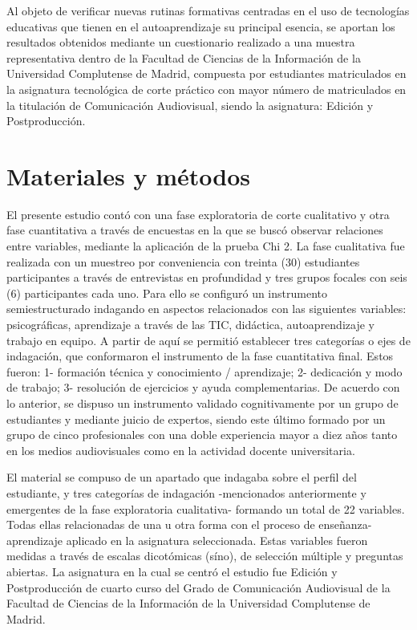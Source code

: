 \documentclass[spanish]{textolivre}
\begin{document}
Al objeto de verificar nuevas rutinas formativas centradas en el uso de tecnologías educativas que tienen en el autoaprendizaje su principal esencia, se aportan los resultados obtenidos mediante un cuestionario realizado a una muestra representativa dentro de la Facultad de Ciencias de la Información de la Universidad Complutense de Madrid, compuesta por estudiantes matriculados en la asignatura tecnológica de corte práctico con mayor número de matriculados en la titulación de Comunicación Audiovisual, siendo la asignatura: Edición y Postproducción.

\section{Materiales y métodos}\label{sec-normas}
El presente estudio contó con una fase exploratoria de corte cualitativo y otra fase cuantitativa a través de encuestas en la que se buscó observar relaciones entre variables, mediante la aplicación de la prueba Chi 2. La fase cualitativa fue realizada con un muestreo por conveniencia con treinta (30) estudiantes participantes a través de entrevistas en profundidad y tres grupos focales con seis (6) participantes cada uno. Para ello se configuró un instrumento semiestructurado indagando en aspectos relacionados con las siguientes variables: psicográficas, aprendizaje a través de las TIC, didáctica, autoaprendizaje y trabajo en equipo.  A partir de aquí se permitió establecer tres categorías o ejes de indagación, que conformaron el instrumento de la fase cuantitativa final. Estos fueron: 1- formación técnica y conocimiento / aprendizaje; 2- dedicación y modo de trabajo; 3- resolución de ejercicios y ayuda complementarias. De acuerdo con lo anterior, se dispuso un instrumento validado cognitivamente por un grupo de estudiantes y mediante juicio de expertos, siendo este último formado por un grupo de cinco profesionales con una doble experiencia mayor a diez años tanto en los medios audiovisuales como en la actividad docente universitaria. 

El material se compuso de un apartado que indagaba sobre el perfil del estudiante, y tres categorías de indagación -mencionados anteriormente y emergentes de la fase exploratoria cualitativa- formando un total de 22 variables. Todas ellas relacionadas de una u otra forma con el proceso de enseñanza-aprendizaje aplicado en la asignatura seleccionada. Estas variables fueron medidas a través de escalas dicotómicas (síno), de selección múltiple y preguntas abiertas. La asignatura en la cual se centró el estudio fue Edición y Postproducción de cuarto curso del Grado de Comunicación Audiovisual de la Facultad de Ciencias de la Información de la Universidad Complutense de Madrid. 
\end{document}
